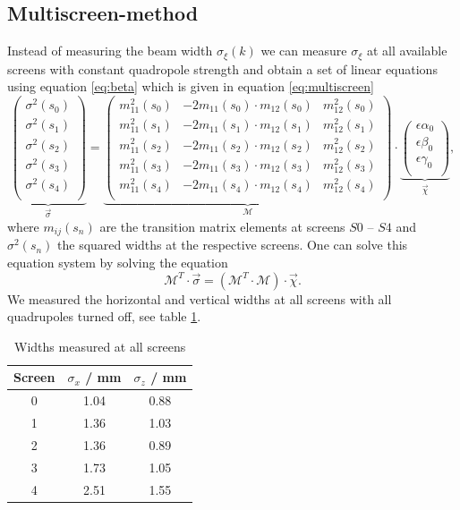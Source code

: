 \documentclass[11pt,a4paper,notitlepage]{scrartcl}
\begin{document}
\subsection{Multiscreen-method}
\label{subsec:msc}
Instead of measuring the beam width $\sigma_\xi(k)$ we can measure $\sigma_\xi$ at all available screens with constant quadropole strength and obtain a set of linear equations using equation \eqref{eq:beta} which is given in equation \eqref{eq:multiscreen} \cite{script}
\begin{equation}
	\underbrace{
	\begin{pmatrix}
		\sigma^2(s_0)\\
		\sigma^2(s_1)\\
		\sigma^2(s_2)\\
		\sigma^2(s_3)\\
		\sigma^2(s_4)\\
	\end{pmatrix}}_{\vec{\sigma}}
	=\underbrace{\begin{pmatrix}
		m_{11}^2(s_0) & -2m_{11}(s_0)\cdot m_{12}(s_0) & m_{12}^2(s_0)\\
		m_{11}^2(s_1) & -2m_{11}(s_1)\cdot m_{12}(s_1) & m_{12}^2(s_1)\\
		m_{11}^2(s_2) & -2m_{11}(s_2)\cdot m_{12}(s_2) & m_{12}^2(s_2)\\
		m_{11}^2(s_3) & -2m_{11}(s_3)\cdot m_{12}(s_3) & m_{12}^2(s_3)\\
		m_{11}^2(s_4) & -2m_{11}(s_4)\cdot m_{12}(s_4) & m_{12}^2(s_4)\\
	\end{pmatrix}}_{\mathcal{M}}
	\cdot
	\underbrace{
	\begin{pmatrix}
		\epsilon\alpha_0\\
		\epsilon\beta_0\\
		\epsilon\gamma_0\\
	\end{pmatrix}}_{\vec{\chi}},
	\label{eq:multiscreen}
\end{equation}
where $m_{ij}(s_n)$ are the transition matrix elements at screens $S0$ -- $S4$ and $\sigma^2(s_n)$ the squared widths at the respective screens. One can solve this equation system by solving the equation $$\mathcal{M}^T\cdot\vec{\sigma}=(\mathcal{M}^T\cdot\mathcal{M})\cdot\vec{\chi}.$$ 
We measured the horizontal and vertical widths at all screens with all quadrupoles turned off, see table \ref{tab:datascreen}. 
\begin{table}[htbp]
	\centering
	\begin{tabular}{c|c|c}
		Screen &   $\sigma_x$ / mm   & $\sigma_z$ / mm \\
		\hline
		\hline
		0      &   1.04      & 0.88    \\
		1      &   1.36      & 1.03    \\
		2      &   1.36      & 0.89    \\
		3      &   1.73      & 1.05    \\
		4      &   2.51      & 1.55   
	\end{tabular}
\caption{Widths measured at all screens}
\label{tab:datascreen}
\end{table}
\end{document}

